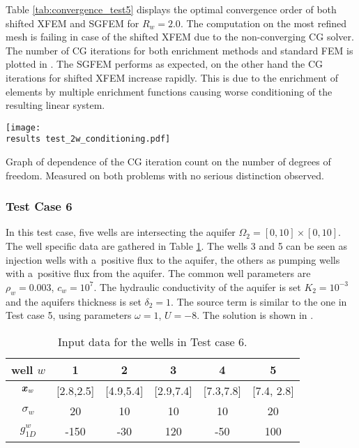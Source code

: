 Table \ref{tab:convergence_test5} displays the optimal convergence order of both shifted XFEM and SGFEM for $R_w=2.0$.
The computation on the most refined mesh is failing in case of the shifted XFEM due to the non-converging CG solver.
The number of CG iterations for both enrichment methods and standard FEM is plotted in .
The SGFEM performs as expected, on the other hand the CG iterations for shifted XFEM increase rapidly.
This is due to the enrichment of elements by multiple enrichment functions causing worse conditioning of the resulting linear system.
%
\begin{graph}[!htb]
  \centering    
    \texttt{[image: \\results test\_2w\_conditioning.pdf]}
  \caption[CG iterations count in Test case 3.]{Graph of dependence of the CG iteration count on the 
  number of degrees of freedom. Measured on both problems with no serious distinction observed.}
  \label{graph:test_2w_conditioning}
\end{graph}



\subsubsection{Test Case 6}
In this test case, five wells are intersecting the aquifer $\Omega_2 = [0,10]\times[0, 10]$.
The well specific data are gathered in Table \ref{tab:test_case6_wells_data}.
The wells 3 and 5 can be seen as injection wells with a~positive flux to the aquifer, the others as pumping wells with a~positive flux from the aquifer.
The common well parameters are $\rho_w = 0.003$, $c_w = 10^{7}$.
The hydraulic conductivity of the aquifer is set $K_2=10^{-3}$ and the aquifers thickness is set $\delta_2=1$.
The source term is similar to the one in Test case 5, using parameters $\omega=1$, $U=-8$.
The solution is shown in .
%
\begin{table}[!htb]
\begin{center}
\begin{tabular}{c|ccccc}
\toprule
well $w$ & 1 & 2 & 3 & 4 & 5 \\
\midrule
$\mathbf{\boldsymbol{x}}_w$     & [2.8,2.5]  & [4.9,5.4]  & [2.9,7.4]  & [7.3,7.8] & [7.4, 2.8] \\
$\sigma_w$  & 20   & 10  & 10  & 10  & 20 \\
$g^w_{1D}$  & -150 & -30 & 120 & -50 & 100 \\
\bottomrule
\end{tabular}
\caption{Input data for the wells in Test case 6.}
\label{tab:test_case6_wells_data}
\end{center}
\end{table}

